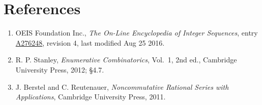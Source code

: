 \documentclass[11pt]{article}
\theoremstyle{definition}
\begin{document}
\section{References}

\begin{enumerate}

\item OEIS Foundation Inc., \emph{The On-Line Encyclopedia of Integer Sequences}, entry \href{https://oeis.org/A276248}{A276248}, revision 4, last modified Aug 25 2016.

\item R. P. Stanley, \emph{Enumerative Combinatorics}, Vol.~1, 2nd ed., Cambridge University Press, 2012; \S4.7.

\item J. Berstel and C. Reutenauer, \emph{Noncommutative Rational Series with Applications}, Cambridge University Press, 2011.

\end{enumerate}
\end{document}
